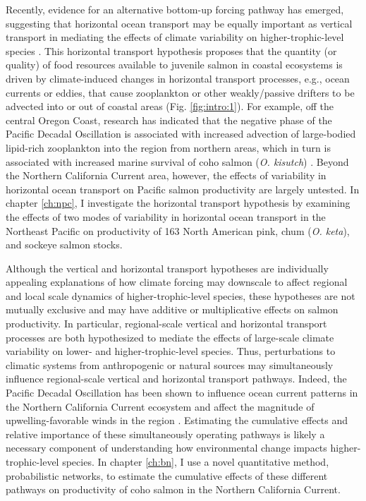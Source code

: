 Recently, evidence for an alternative bottom-up forcing pathway has emerged,
suggesting that horizontal ocean transport may be equally important as vertical
transport in mediating the effects of climate variability on
higher-trophic-level species \citep{DiLorenzo2013b}. This horizontal transport
hypothesis proposes that the quantity (or quality) of food resources available
to juvenile salmon in coastal ecosystems is driven by climate-induced changes in
horizontal transport processes, e.g., ocean currents or eddies, that cause
zooplankton or other weakly/passive drifters to be advected into or out of
coastal areas (Fig. \ref{fig:intro:1}). For example, off the central Oregon
Coast, research has indicated that the negative phase of the Pacific Decadal
Oscillation is associated with increased advection of large-bodied lipid-rich
zooplankton into the region from northern areas, which in turn is associated
with increased marine survival of coho salmon (\emph{O. kisutch})
\citep{Keister2011a, Bi2011a}. Beyond the Northern California Current area,
however, the effects of variability in horizontal ocean transport on Pacific
salmon productivity are largely untested. In chapter \ref{ch:npc}, I investigate
the horizontal transport hypothesis by examining the effects of two modes of
variability in horizontal ocean transport in the Northeast Pacific on
productivity of 163 North American pink, chum (\emph{O. keta}), and sockeye
salmon stocks.

Although the vertical and horizontal transport hypotheses are individually
appealing explanations of how climate forcing may downscale to affect regional
and local scale dynamics of higher-trophic-level species, these hypotheses are
not mutually exclusive and may have additive or multiplicative effects on salmon
productivity. In particular, regional-scale vertical and horizontal transport
processes are both hypothesized to mediate the effects of large-scale climate
variability on lower- and higher-trophic-level species. Thus, perturbations to
climatic systems from anthropogenic or natural sources may simultaneously
influence regional-scale vertical and horizontal transport pathways. Indeed, the
Pacific Decadal Oscillation has been shown to influence ocean current patterns
in the Northern California Current ecosystem and affect the magnitude of
upwelling-favorable winds in the region \citep{Keister2011a, Chhak2007}.
Estimating the cumulative effects and relative importance of these
simultaneously operating pathways is likely a necessary component of
understanding how environmental change impacts higher-trophic-level species. In
chapter \ref{ch:bn}, I use a novel quantitative method, probabilistic networks,
to estimate the cumulative effects of these different pathways on productivity
of coho salmon in the Northern California Current.


